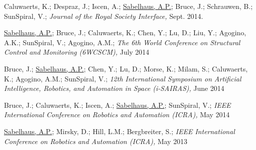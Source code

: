 \documentclass[letterpaper]{deedy-resume} %
\begin{document}
{\begin{etaremune}
\item {} Caluwaerts, K.; Despraz, J.; Iscen, A.; \underline{Sabelhaus, A.P.}; Bruce, J.; Schrauwen, B.; SunSpiral, V.;  {\it Journal of the Royal Society Interface,} Sept. 2014.

\item {} \underline{Sabelhaus, A.P.}; Bruce, J.; Caluwaerts, K.; Chen, Y.; Lu, D.; Liu, Y.; Agogino, A.K.; SunSpiral, V.; Agogino, A.M.; {\it The 6th World Conference on Structural Control and Monitoring (6WCSCM),} July 2014

\item {} Bruce, J.; \underline{Sabelhaus, A.P.}; Chen, Y.; Lu, D.; Morse, K.; Milam, S.; Caluwaerts, K.; Agogino, A.M.; SunSpiral, V.; {\it 12th International Symposium on Artificial Intelligence, Robotics, and Automation in Space (i-SAIRAS),} June 2014

\item {} Bruce, J.; Caluwaerts, K.; Iscen, A.; \underline{Sabelhaus, A.P.}; SunSpiral, V.; {\it IEEE International Conference on Robotics and Automation (ICRA),} May 2014

\item {} \underline{Sabelhaus, A.P.}; Mirsky, D.; Hill, L.M.; Bergbreiter, S.; {\it IEEE International Conference on Robotics and Automation (ICRA),} May 2013


\end{etaremune}








}
\end{document}
